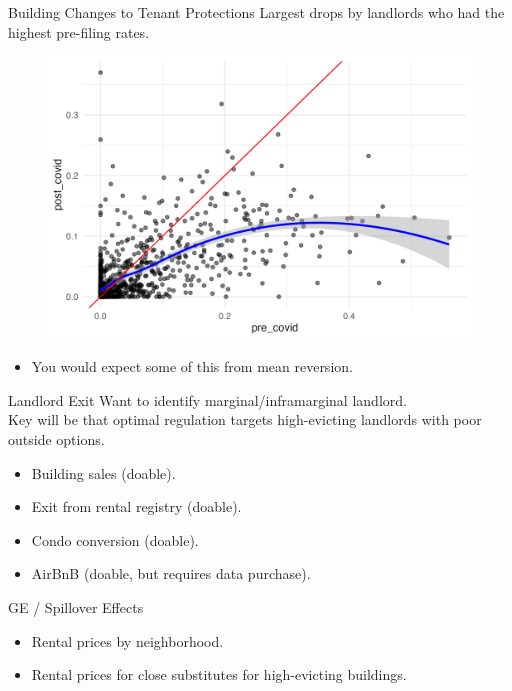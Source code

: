 \documentclass[aspectratio=169]{beamer}
\begin{document}
\begin{frame}{Building Changes to Tenant Protections}
Largest drops by landlords who had the highest pre-filing rates.

\medskip
\begin{figure}
  \includegraphics[width=\linewidth]{figs/filing_rate_pre_post_covid.png}
  \fbox{\rule{0pt}{2.2in}\rule{0.95\linewidth}{0pt}}
\end{figure}

\begin{itemize}
  \item You would expect some of this from mean reversion.
\end{itemize}
\end{frame}


\begin{frame}{Landlord Exit}
Want to identify marginal/inframarginal landlord.\\
Key will be that optimal regulation targets high-evicting landlords with poor outside options.

\medskip
\begin{itemize}
  \item Building sales (doable).
  \item Exit from rental registry (doable).
  \item Condo conversion (doable).
  \item AirBnB (doable, but requires data purchase).
\end{itemize}
\end{frame}


\begin{frame}{GE / Spillover Effects}
\begin{itemize}
  \item Rental prices by neighborhood.
  \item Rental prices for close substitutes for high-evicting buildings.
\end{itemize}
\end{frame}
\end{document}
